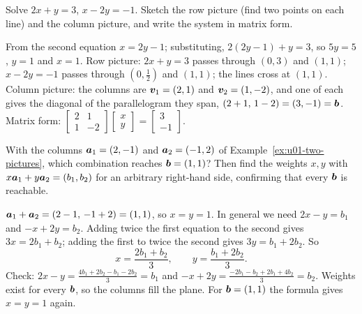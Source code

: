 \begin{exercise}\label{ex:u01-recitation}
Solve $2x+y=3$, $x-2y=-1$. Sketch the row picture (find two points on each line) and the
column picture, and write the system in matrix form.
\end{exercise}
\begin{solution}
From the second equation $x=2y-1$; substituting, $2(2y-1)+y=3$, so $5y=5$, $y=1$ and $x=1$.
Row picture: $2x+y=3$ passes through $(0,3)$ and $(1,1)$; $x-2y=-1$ passes through
$(0,\tfrac12)$ and $(1,1)$; the lines cross at $(1,1)$. Column picture: the columns are
$\boldsymbol{v}_1=(2,1)$ and $\boldsymbol{v}_2=(1,-2)$, and one of each gives the diagonal of the
parallelogram they span, $(2+1,\,1-2)=(3,-1)=\boldsymbol{b}$. Matrix form:
$\begin{bmatrix} 2 & 1\\ 1 & -2\end{bmatrix}\begin{bmatrix} x\\ y\end{bmatrix}
=\begin{bmatrix} 3\\ -1\end{bmatrix}$.
\end{solution}

\begin{exercise}\label{ex:u01-every-b}
With the columns $\boldsymbol{a}_1=(2,-1)$ and $\boldsymbol{a}_2=(-1,2)$ of Example~\ref{ex:u01-two-pictures},
which combination reaches $\boldsymbol{b}=(1,1)$? Then find the weights $x,y$ with
$x\boldsymbol{a}_1+y\boldsymbol{a}_2=(b_1,b_2)$ for an arbitrary right-hand side, confirming that every $\boldsymbol{b}$
is reachable.
\end{exercise}
\begin{solution}
$\boldsymbol{a}_1+\boldsymbol{a}_2=(2-1,\,-1+2)=(1,1)$, so $x=y=1$. In general we need $2x-y=b_1$ and
$-x+2y=b_2$. Adding twice the first equation to the second gives $3x=2b_1+b_2$; adding the
first to twice the second gives $3y=b_1+2b_2$. So
\[
  x=\frac{2b_1+b_2}{3},\qquad y=\frac{b_1+2b_2}{3}.
\]
Check: $2x-y=\frac{4b_1+2b_2-b_1-2b_2}{3}=b_1$ and $-x+2y=\frac{-2b_1-b_2+2b_1+4b_2}{3}=b_2$.
Weights exist for every $\boldsymbol{b}$, so the columns fill the plane. For $\boldsymbol{b}=(1,1)$ the
formula gives $x=y=1$ again.
\end{solution}

